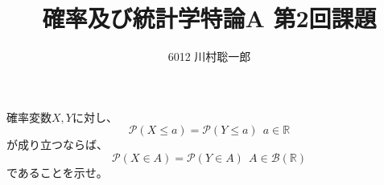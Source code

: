 \documentclass[dvipdfmx]{jsarticle}
\title{確率及び統計学特論A 第2回課題}
\author{6012 川村聡一郎}
\date{}
\newcommand{\R}{\mathbb{R}}
\begin{document}
\maketitle

\begin{tcolorbox}
	確率変数$X, Y$に対し、
\begin{equation}
    \mathcal{P}(X\le a)= \mathcal{P}(Y\le a)\ \ a\in \R
\end{equation}
    が成り立つならば、
\begin{equation}
    \mathcal{P}(X\in A)= \mathcal{P}(Y\in A)\ \ A\in \mathcal{B}(\R)
\end{equation}
    であることを示せ。
\end{tcolorbox}

\begin{answer}
	
\end{answer}
\end{document}

